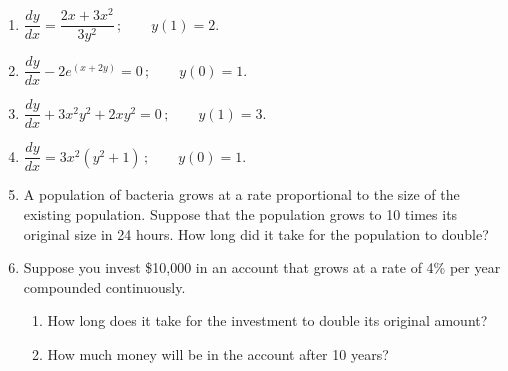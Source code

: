 \documentclass[10pt]{article}
\begin{document}
\begin{enumerate}[leftmargin=*, label=\numbox{\arabic*}, resume]

\item
    \begin{problem}[\vspace{5cm}]
        \(\dfrac{dy}{dx} = \dfrac{2x + 3x^2}{3y^2}\,; \qquad y(1) = 2.\)
    \end{problem}

\item
    \begin{problem}[\vspace{5cm}]
        \(\dfrac{dy}{dx} - 2e^{(x + 2y)} = 0\,; \qquad y(0) = 1.\)
    \end{problem}

\item
    \begin{problem}[\vspace{5cm}]
        \(\dfrac{dy}{dx} + 3x^2 y^2 + 2xy^2 = 0\,; \qquad y(1) = 3.\)
    \end{problem}

\item
    \begin{problem}[\vspace{5cm}]
        \(\dfrac{dy}{dx} = 3x^2 (y^2 + 1)\,; \qquad y(0) = 1.\)
    \end{problem}

\item
    \begin{problem}[\vspace{5cm}]
        A population of bacteria grows at a rate proportional to the size of the
        existing population. Suppose that the population grows to 10 times its
        original size in 24 hours. How long did it take for the population to double?
    \end{problem}

\item
    \begin{problem}[\vspace{5cm}]
        Suppose you invest \$10{,}000 in an account that grows at a rate of 4\% per
        year compounded continuously.
        \begin{enumerate}[label=(\alph*)]
            \item How long does it take for the investment to double its original amount?
            \item How much money will be in the account after 10 years?
        \end{enumerate}
    \end{problem}


\end{enumerate}
\end{document}
